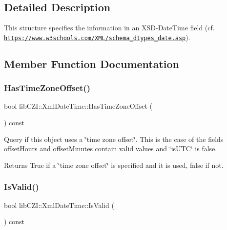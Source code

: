 \subsection{Detailed Description}
This structure specifies the information in an X\+S\+D-\/\+Date\+Time field (cf. \href{https://www.w3schools.com/XML/schema_dtypes_date.asp}{\tt https\+://www.\+w3schools.\+com/\+X\+M\+L/schema\+\_\+dtypes\+\_\+date.\+asp}). 

\subsection{Member Function Documentation}
\mbox{\label{structlib_c_z_i_1_1_xml_date_time_abdd0b4dc181a4825b2eaf97aea58d44d}} 
\subsubsection{\texorpdfstring{Has\+Time\+Zone\+Offset()}{HasTimeZoneOffset()}}
{\footnotesize\ttfamily bool lib\+C\+Z\+I\+::\+Xml\+Date\+Time\+::\+Has\+Time\+Zone\+Offset (\begin{DoxyParamCaption}{ }\end{DoxyParamCaption}) const\hspace{0.3cm}{\ttfamily [inline]}}

Query if this object uses a \char`\"{}time zone offset\char`\"{}. This is the case of the fields offset\+Hours and offset\+Minutes contain valid values and \char`\"{}is\+U\+T\+C\char`\"{} is false. \begin{DoxyReturn}{Returns}
True if a \char`\"{}time zone offset\char`\"{} is specified and it is used, false if not. 
\end{DoxyReturn}
\mbox{\label{structlib_c_z_i_1_1_xml_date_time_a3ecf25b06c3b6e40978e9141a62a9b87}} 
\subsubsection{\texorpdfstring{Is\+Valid()}{IsValid()}}
{\footnotesize\ttfamily bool lib\+C\+Z\+I\+::\+Xml\+Date\+Time\+::\+Is\+Valid (\begin{DoxyParamCaption}{ }\end{DoxyParamCaption}) const}

